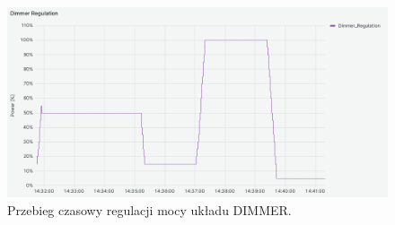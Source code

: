     \begin{figure}[H]
        \centering
        \includegraphics[width=0.8\linewidth]{graphics/grafana/dimmer_regulation-lm.png}
        \caption{Przebieg czasowy regulacji mocy układu DIMMER.}
        \label{fig:graph-dimmer-regulation}
    \end{figure}